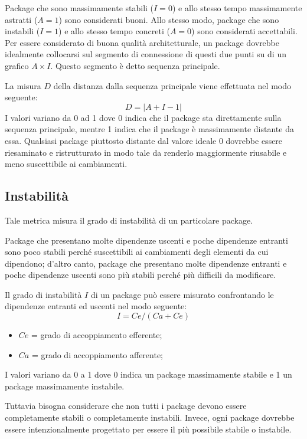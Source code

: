 Package che sono massimamente stabili ($I = 0$) e allo stesso tempo massimamente astratti ($A = 1$) sono considerati buoni. Allo stesso modo, package che sono instabili ($I = 1$) e allo stesso tempo concreti ($A = 0$) sono considerati accettabili. Per essere considerato di buona qualità architetturale, un package dovrebbe idealmente collocarsi sul segmento di connessione di questi due punti su di un grafico $A \times I$. Questo segmento è detto sequenza principale.

La misura $D$ della distanza dalla sequenza principale viene effettuata nel modo seguente:
\begin{equation}
	D = | A + I - 1 | 
\end{equation}
I valori variano da 0 ad 1 dove 0 indica che il package sta direttamente sulla sequenza principale, mentre 1 indica che il package è massimamente distante da essa. Qualsiasi package piuttosto distante dal valore ideale 0 dovrebbe essere riesaminato e ristrutturato in modo tale da renderlo maggiormente riusabile e meno suscettibile ai cambiamenti.



\subsection{Instabilità}
Tale metrica misura il grado di instabilità di un particolare package.

Package che presentano molte dipendenze uscenti e poche dipendenze entranti sono poco stabili perché suscettibili ai cambiamenti degli elementi da cui dipendono; d'altro canto, package che presentano molte dipendenze entranti e poche dipendenze uscenti sono più stabili perché più difficili da modificare.

Il grado di instabilità $I$ di un package può essere misurato confrontando le dipendenze entranti ed uscenti nel modo seguente:	
\begin{equation}
	I = Ce/(Ca + Ce) 
\end{equation}
\begin{itemize}
	\item $Ce$ = grado di accoppiamento efferente;
	\item $Ca$ = grado di accoppiamento afferente;
\end{itemize}
I valori variano da 0 a 1 dove 0 indica un package massimamente stabile e 1 un package massimamente instabile.

Tuttavia bisogna considerare che non tutti i package devono essere completamente stabili o completamente instabili. Invece, ogni package dovrebbe essere intenzionalmente progettato per essere il più possibile stabile o instabile.
	


